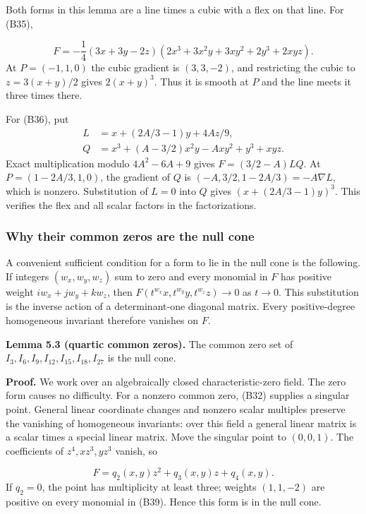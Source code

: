 \documentclass[
]{article}
\begin{document}
Both forms in this lemma are a line times a cubic with a flex on that
line. For (B35), \protect{}\label{equation-B38}{}

\[
F=-\frac14(3x+3y-2z)
(2x^3+3x^2y+3xy^2+2y^3+2xyz).
\tag{B38}
\] At \(P=(-1,1,0)\) the cubic gradient is \((3,3,-2)\), and restricting
the cubic to \(z=3(x+y)/2\) gives \(2(x+y)^3\). Thus it is smooth at
\(P\) and the line meets it three times there.

For (B36), put \[
\begin{aligned}
L&=x+(2A/3-1)y+4Az/9,\\
Q&=x^3+(A-3/2)x^2y-Axy^2+y^3+xyz.
\end{aligned}
\] Exact multiplication modulo \(4A^2-6A+9\) gives \(F=(3/2-A)LQ\). At
\(P=(1-2A/3,1,0)\), the gradient of \(Q\) is
\((-A,3/2,1-2A/3)=-A\nabla L\), which is nonzero. Substitution of
\(L=0\) into \(Q\) gives \((x+(2A/3-1)y)^3\). This verifies the flex and
all scalar factors in the factorizations.

\subsubsection{Why their common zeros are the null
cone}\label{why-their-common-zeros-are-the-null-cone}

A convenient sufficient condition for a form to lie in the null cone is
the following. If integers \((w_x,w_y,w_z)\) sum to zero and every
monomial in \(F\) has positive weight \(iw_x+jw_y+kw_z\), then
\(F(t^{w_x}x,t^{w_y}y,t^{w_z}z)\to0\) as \(t\to0\). This substitution is
the inverse action of a determinant-one diagonal matrix. Every
positive-degree homogeneous invariant therefore vanishes on \(F\).

\protect{}\label{lemma-5-3}{}

\textbf{Lemma 5.3 (quartic common zeros).} The common zero set of
\(I_3,I_6,I_9,I_{12},I_{15},I_{18},I_{27}\) is the null cone.

\textbf{Proof.} We work over an algebraically closed characteristic-zero
field. The zero form causes no difficulty. For a nonzero common zero,
(B32) supplies a singular point. General linear coordinate changes and
nonzero scalar multiples preserve the vanishing of homogeneous
invariants: over this field a general linear matrix is a scalar times a
special linear matrix. Move the singular point to \((0,0,1)\). The
coefficients of \(z^4,xz^3,yz^3\) vanish, so
\protect{}\label{equation-B39}{}

\[
F=q_2(x,y)z^2+q_3(x,y)z+q_4(x,y).
\tag{B39}
\] If \(q_2=0\), the point has multiplicity at least three; weights
\((1,1,-2)\) are positive on every monomial in (B39). Hence this form is
in the null cone.
\end{document}
